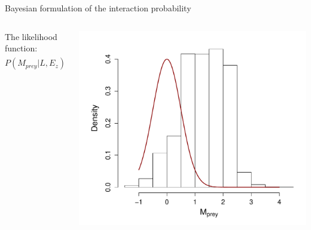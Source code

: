 \documentclass{eecslides}
\begin{document}
	\begin{frame}{Bayesian formulation of the interaction probability}
 	    	\begin{columns}
			\begin{column}{0.4\textwidth}							
			The likelihood function: \\
			$P(M_{prey}|L,E_z) = \frac{P(L_{ijz}|M_{prey},M_{pred},E_z)P(M_{prey})}{P(L|M_{pred})}$
			\end{column}
			\begin{column}{0.6\textwidth}
				\includegraphics[height=0.6\textheight]{prey_freq}\\
			\end{column}				
		\end{columns}	   
	\end{frame}

\end{document}
